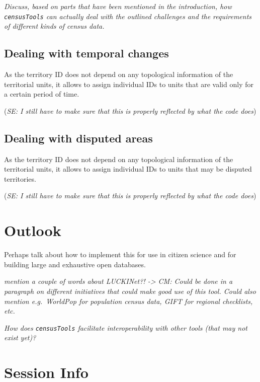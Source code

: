 \documentclass[12pt,]{article}
\begin{document}
\emph{Discuss, based on parts that have been mentioned in the introduction, how \texttt{censusTools} can actually deal with the outlined challenges and the requirements of different kinds of census data.}

\hypertarget{dealing-with-temporal-changes}{%
\subsection{Dealing with temporal changes}\label{dealing-with-temporal-changes}}

As the territory ID does not depend on any topological information of the territorial units, it allows to assign individual IDs to units that are valid only for a certain period of time.

(\emph{SE: I still have to make sure that this is properly reflected by what the code does})

\hypertarget{dealing-with-disputed-areas}{%
\subsection{Dealing with disputed areas}\label{dealing-with-disputed-areas}}

As the territory ID does not depend on any topological information of the territorial units, it allows to assign individual IDs to units that may be disputed territories.

(\emph{SE: I still have to make sure that this is properly reflected by what the code does})

\hypertarget{outlook}{%
\section{Outlook}\label{outlook}}

Perhaps talk about how to implement this for use in citizen science and for building large and exhaustive open databases.

\emph{mention a couple of words about LUCKINet?! -\textgreater{} CM: Could be done in a paragraph on different initiatives that could make good use of this tool. Could also mention e.g.~WorldPop for population census data, GIFT for regional checklists, etc.}

\emph{How does \texttt{censusTools} facilitate interoperability with other tools (that may not exist yet)?}

\hypertarget{session-info}{%
\section{Session Info}\label{session-info}}
\end{document}
